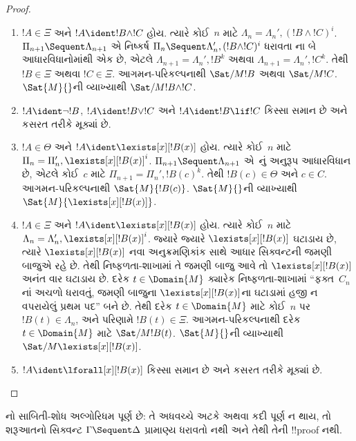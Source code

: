 \documentclass[../../../include/open-logic-section]{subfiles}
\begin{document}
\begin{proof}
\begin{enumerate}
  \item $!A \in \Xi$
  અને
  $!A \ident !B \land !C$
  હોય. ત્યારે
  કોઈ~$n$ માટે
  $\Lambda_n = \Lambda_n', (!B \land !C)^i$.
  $\Pi_{n+1} \Sequent
  \Lambda_{n+1}$
  એ નિષ્કર્ષ
  $\Pi_n \Sequent \Lambda'_n, (!B \land !C)^i$
  ધરાવતા
  \RightR{\land}ના
  બે આધારવિધાનોમાંથી
  એક છે, એટલે
  $\Lambda_{n+1} = \Lambda_n', !B^k$
  અથવા
  $\Lambda_{n+1} = \Lambda_n',
  !C^k$.
  તેથી
  $!B \in \Xi$
  અથવા
  $!C \in \Xi$.
  આગમન-પરિકલ્પનાથી
  $\Sat/{M}{!B}$
  અથવા
  $\Sat/{M}{!C}$.
  $\Sat{M}{}$ની
  વ્યાખ્યાથી
  $\Sat/{M}{!B \land !C}$.
  
  
  \item
  $!A \ident \lnot !B$,
  $!A \ident !B \lor !C$
  અને
  $!A \ident !B \lif !C$
  કિસ્સા સમાન
  છે અને
  કસરત તરીકે
  મૂક્યાં છે.

  \item $!A \in \Theta$
  અને
  $!A \ident \lexists[x][!B(x)]$
  હોય. ત્યારે
  કોઈ~$n$ માટે
  $\Pi_n = \Pi_n', \lexists[x][!B(x)]^i$.
  $\Pi_{n+1}
  \Sequent \Lambda_{n+1}$
  એ~\LeftR{\lexists}નું
  અનુરૂપ
  આધારવિધાન
  છે, એટલે
  કોઈ~$c$ માટે
  $\Pi_{n+1} = \Pi_n', !B(c)^k$.
  તેથી
  $!B(c) \in \Theta$
  અને
  $c \in C$.
  આગમન-પરિકલ્પનાથી
  $\Sat{M}{!B(c)}$.
  $\Sat{M}{}$ની
  વ્યાખ્યાથી
  $\Sat{M}{\lexists[x][!B(x)]}$.

  \item $!A \in \Xi$
  અને
  $!A \ident \lexists[x][!B(x)]$
  હોય. ત્યારે
  કોઈ~$n$ માટે
  $\Lambda_n = \Lambda_n', \lexists[x][!B(x)]^i$.
  જ્યારે જ્યારે
  $\lexists[x][!B(x)]$
  ઘટાડાય છે,
  ત્યારે
  $\lexists[x][!B(x)]$
  નવા અનુક્રમણિકાંક
  સાથે આધાર
  સિક્વન્ટની
  જમણી બાજુએ
  રહે છે.
  તેથી નિષ્ફળતા-શાખામાં
  તે જમણી બાજુ
  આવે તો
  $\lexists[x][!B(x)]$
  અનંત વાર
  ઘટાડાય છે.
  દરેક
  $t \in
  \Domain{M}$
  ક્યારેક
  નિષ્ફળતા-શાખામાં
  ``ફક્ત~$C_n$નાં
  અચળો ધરાવતું,
  જમણી બાજુના
  $\lexists[x][!B(x)]$ના
  ઘટાડામાં હજી
  ન વપરાયેલું
  પ્રથમ પદ''
  બને છે.
  તેથી દરેક
  $t \in \Domain{M}$
  માટે કોઈ~$n$
  પર
  $!B(t) \in \Lambda_n$,
  અને પરિણામે
  $!B(t) \in \Xi$.
  આગમન-પરિકલ્પનાથી
  દરેક
  $t \in
  \Domain{M}$
  માટે
  $\Sat/{M}{!B(t)}$.
  $\Sat{M}{}$ની
  વ્યાખ્યાથી
  $\Sat/{M}{\lexists[x][!B(x)]}$.

  \item
  $!A \ident \lforall[x][!B(x)]$
  કિસ્સા સમાન
  છે અને
  કસરત તરીકે
  મૂક્યાં છે.
\end{enumerate}
\end{proof}

\begin{cor}
નો
સાબિતી-શોધ
અલ્ગોરિધમ પૂર્ણ
છે: તે અધવચ્ચે
અટકે અથવા
કદી પૂર્ણ ન
થાય, તો શરૂઆતનો
સિક્વન્ટ
$\Gamma \Sequent \Delta$
પ્રામાણ્ય ધરાવતો નથી
અને તેથી
તેની !!{proof}
નથી.
\end{cor}
\end{document}
